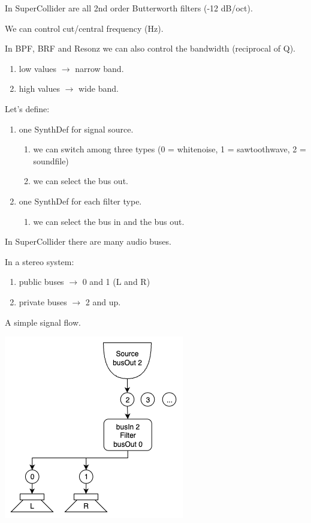 In SuperCollider are all 2nd order Butterworth filters (-12 dB/oct).

We can control cut/central frequency (Hz).

In BPF, BRF and Resonz we can also control the bandwidth (reciprocal of Q).

\begin{enumerate}
\tightlist 
\item low values \(\rightarrow\) narrow band. 
\item high values \(\rightarrow\) wide band.
\end{enumerate}

Let's define:

\begin{enumerate}
\tightlist 
\item one SynthDef for signal source. 
    \begin{enumerate}
    \tightlist 
    \item we can switch among three types (0 = whitenoise, 1 = sawtoothwave, 2 = soundfile) 
    \item we can select the bus out.
    \end{enumerate} 
\item one SynthDef for each filter type.
    \begin{enumerate}
    \tightlist  
    \item we can select the bus in and the bus out.
    \end{enumerate}
\end{enumerate}

In SuperCollider there are many audio buses.

In a stereo system: 
\begin{enumerate}
\tightlist 
\item public buses \(\rightarrow\) 0 and 1 (L and R) 
\item private buses \(\rightarrow\) 2 and up.
\end{enumerate}

A simple signal flow.

\begin{center}
\includegraphics[scale=0.4]{../img/filt_1.png}
\end{center}

